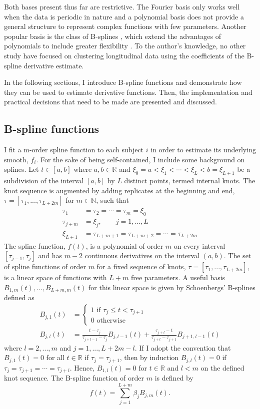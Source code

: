 Both bases present thus far are restrictive. The Fourier basis only works well when the data is periodic in nature and a polynomial basis does not provide a general structure to represent complex functions with few parameters. Another popular basis is the class of B-splines \cite{deboor1978, schumaker1981}, which extend the advantages of polynomials to include greater flexibility \cite{abraham2003}. To the author's knowledge, no other study have focused on clustering longitudinal data using the coefficients of the B-spline derivative estimate.

In the following sections, I introduce B-spline functions and demonstrate how they can be used to estimate derivative functions. Then, the implementation and practical decisions that need to be made are presented and discussed.

\subsection{B-spline functions}\label{chp4:bsplines}
I fit a m-order spline function to each subject $i$ in order to estimate its underlying smooth, $f_i$. For the sake of being self-contained, I include some background on splines. Let $t\in[a,b]$ where $a,b\in\mathbb{R}$ and $\xi_0=a<\xi_{1}<\cdots<\xi_{L} < b = \xi_{L+1}$ be a subdivision of  the interval $[a,b]$ by $L$ distinct points, termed internal knots. The knot sequence is augmented by adding replicates at the beginning and end, $\tau=[\tau_{1},...,\tau_{L+2m}]$ for $m\in\mathbb{N}$, such that 
\begin{align*}
\tau_{1}&=\tau_{2}=\cdots =\tau_{m} =\xi_{0}\\
\tau_{j+m}& = \xi_{j}, \quad\quad j=1,...,L\\
\xi_{L+1}&=\tau_{L+m+1}=\tau_{L+m+2}=\cdots =\tau_{L+2m} 
\end{align*}
The spline function, $f(t)$, is a polynomial of order $m$ on every interval $[\tau_{j-1},\tau_{j}]$ and has $m-2$ continuous derivatives on the interval $(a,b)$. The set of spline functions of order $m$ for a fixed sequence of knots, $\tau = [\tau_1,...,\tau_{L+2m}]$, is a linear space of functions with $L+m$ free parameters. A useful basis $B_{1,m}(t),...,B_{L+m,m}(t)$ for this linear space is given by Schoenbergs' B-splines \cite{curry1966, de1976} defined as
\begin{align*}
B_{j,1}(t) &= \begin{cases}
1 \text{ if }\tau_j\leq t < \tau_{j+1}\\
0\text{ otherwise}
\end{cases}\\
B_{j,l}(t) &= \frac{t-\tau_j}{\tau_{j+l-1}-\tau_j} B_{j,l-1}(t)+\frac{\tau_{j+l}-t}{\tau_{j+l}-\tau_{j+1}} B_{j+1,l-1}(t)
\end{align*}
where $l=2,...,m$ and $j=1,...,L+2m-l$.  If I adopt the convention that $B_{j,1}(t)=0$ for all $t\in\mathbb{R}$ if $\tau_{j}=\tau_{j+1}$, then by induction $B_{j,l}(t)=0$ if $\tau_{j}=\tau_{j+1}=\cdots=\tau_{j+l}$. Hence, $B_{1,l}(t)=0$ for $t\in\mathbb{R}$ and $l<m$ on the defined knot sequence. The B-spline function of order $m$ is defined by
$$f(t) = \sum^{L+m}_{j=1} \beta_j B_{j,m}(t).$$

